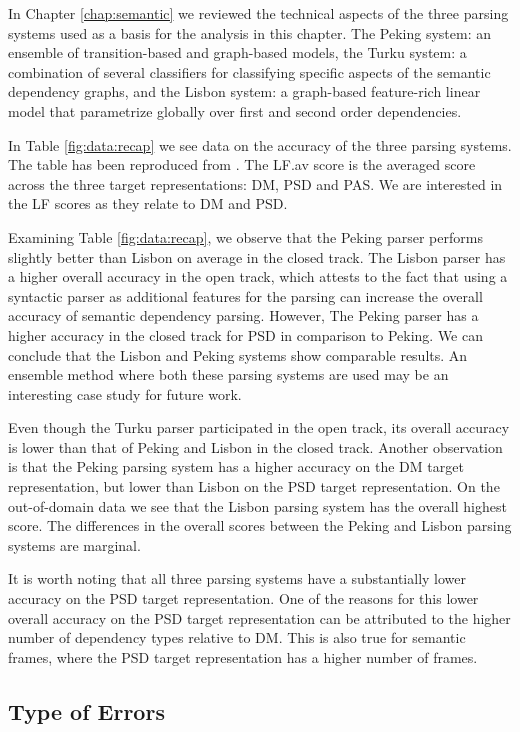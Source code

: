 In Chapter \ref{chap:semantic} we reviewed the technical aspects of the three parsing systems used as a basis for the analysis in this chapter. The Peking system: an ensemble of transition-based and graph-based models, the Turku system: a combination of several classifiers for classifying specific aspects of the semantic dependency graphs, and the Lisbon system: a graph-based feature-rich linear model that parametrize globally over first and second order dependencies.

In Table \ref{fig:data:recap} we see data on the accuracy of the three parsing systems. The table has been reproduced from . The LF.av score is the averaged score across the three target representations: DM, PSD and PAS. We are interested in the LF scores as they relate to DM and PSD.

Examining Table \ref{fig:data:recap}, we observe that the Peking parser performs slightly better than Lisbon on average in the closed track. The Lisbon parser has a higher overall accuracy in the open track, which attests to the fact that using a syntactic parser as additional features for the parsing can increase the overall accuracy of semantic dependency parsing. However, The Peking parser has a higher accuracy in the closed track for PSD in comparison to Peking. We can conclude that the Lisbon and Peking systems show comparable results. An ensemble method where both these parsing systems are used may be an interesting case study for future work.

Even though the Turku parser participated in the open track, its overall accuracy is lower than that of Peking and Lisbon in the closed track. Another observation is that the Peking parsing system has a higher accuracy on the DM target representation, but lower than Lisbon on the PSD target representation. On the out-of-domain data we see that the Lisbon parsing system has the overall highest score. The differences in the overall scores between the Peking and Lisbon parsing systems are marginal.

It is worth noting that all three parsing systems have a substantially lower accuracy on the PSD target representation. One of the reasons for this lower overall accuracy on the PSD target representation can be attributed to the higher number of dependency types relative to DM. This is also true for semantic frames, where the PSD target representation has a higher number of frames.

\subsection{Type of Errors}

